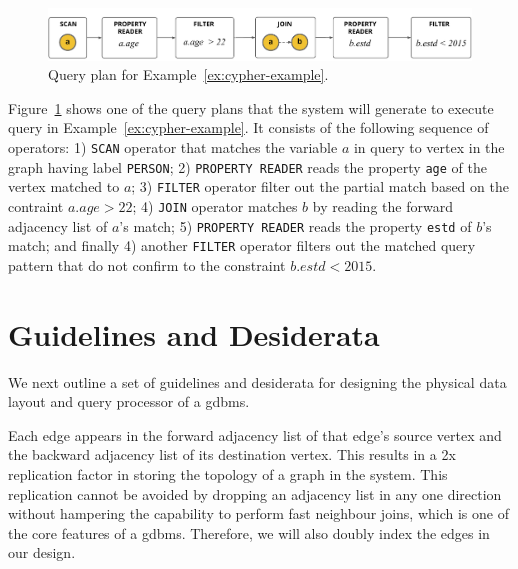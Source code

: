 \begin{figure}
	\hfill\includegraphics[scale=0.78]{img/ex-qp}\hfill
	\vspace{-10pt}
	\caption{Query plan for Example~\ref{ex:cypher-example}.}
	\vspace{-8pt}
	\label{fig:ex-qp}
\end{figure}

Figure~\ref{fig:ex-qp} shows one of the query plans that the system will generate to execute query in Example~\ref{ex:cypher-example}. It consists of the following sequence of operators: 1) \texttt{SCAN} operator that matches the variable $a$ in query to vertex in the graph having label \texttt{PERSON}; 2) \texttt{PROPERTY READER} reads the property \texttt{age} of the vertex matched to $a$; 3) \texttt{FILTER} operator filter out the partial match based on the contraint $a.age>22$; 4) \texttt{JOIN} operator matches $b$ by reading the forward adjacency list of $a$'s match; 5) \texttt{PROPERTY READER} reads the property \texttt{estd} of $b$'s match; and finally 4) another \texttt{FILTER} operator filters out the matched query pattern that do not confirm to the constraint $b.estd < 2015$.

\section{Guidelines and Desiderata}
\label{sec:guidelines}

We next outline a set of guidelines and desiderata for designing the physical data layout and query processor of a \gls{gdbms}.

\begin{guideline}
	\vspace{-5pt}
	Each edge appears in the forward adjacency list of that edge's source vertex and the backward adjacency list of its destination vertex. This results in a 2x replication factor in storing the topology of a graph in the system. This replication cannot be avoided by dropping an adjacency list in any one direction without hampering the capability to perform fast neighbour joins, which is one of the core features of a \gls{gdbms}. Therefore, we will also doubly index the edges in our design.
\end{guideline}


